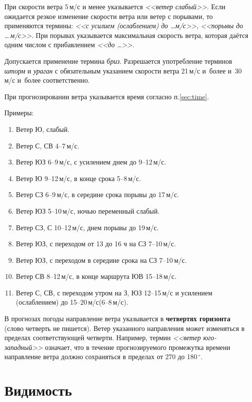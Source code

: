 \documentclass[a4paper, 12pt, twoside, final, book, russian, fittopage, cyremdash, openright]{ncc}
\newcommand{\mps}{\,м/с\xspace}
\newcommand{\gr}{\ensuremath{\,^\circ}\xspace}
\begin{document}
При скорости ветра 5\mps и менее указывается \textit{<<ветер слабый>>}. Если
ожидается резкое изменение скорости ветра или ветер с порывами, то
применяются термины: \textit{<<с усилием (ослаблением) до \ldots м/с>>}, \textit{<<порывы до
\ldots\mps>>}. При порывах указывается максимальная скорость ветра, которая
даётся одним числом с прибавлением \textit{<<до \ldots>>}.

Допускается применение термина \textit{бриз}.  Разрешается употребление
терминов \textit{шторм} и \textit{ураган} с обязательным указанием скорости
ветра 21\mps и~более и~30\mps и~более соответственно.

При прогнозировании ветра указывается время согласно п.\ref{sec:time}.

Примеры:
\begin{enumerate}[label={}]
\item Ветер Ю, слабый.
\item Ветер С, СВ 4--7\mps.
\item Ветер ЮЗ 6--9\mps, с усилением днем до 9--12\mps.
\item Ветер Ю 9--12\mps, в конце срока 5--8\mps.
\item Ветер СЗ 6--9\mps, в середине срока порывы до 17\mps.
\item Ветер ЮЗ 5--10\mps, ночью переменный слабый.
\item Ветер СЗ, С 10--12\mps, днем порывы до 19\mps.
\item Ветер ЮЗ, с переходом от 13 до 16 ч на СЗ 7--10\mps.
\item Ветер ЮЗ, с переходом в середине срока на СЗ 7--10\mps.
\item Ветер СВ 8--12\mps, в конце маршрута ЮВ 15--18\mps.
\item Ветер С, СВ, с переходом утром на З, ЮЗ 12--15\mps и усилением (ослаблением) до 15--20\mps (6--8\mps).
\end{enumerate}

В прогнозах погоды направление ветра указывается в \textbf{четвертях
  горизонта} (слово четверть не пишется). Ветер указанного направления
может изменяться в пределах соответствующей четверти. Например, термин
\textit{<<ветер юго-западный>>} означает, что в течение
прогнозируемого промежутка времени направление ветра должно
сохраняться в пределах от 270 до 180\gr.

\section{Видимость}
\label{sec:visibility}
\end{document}
